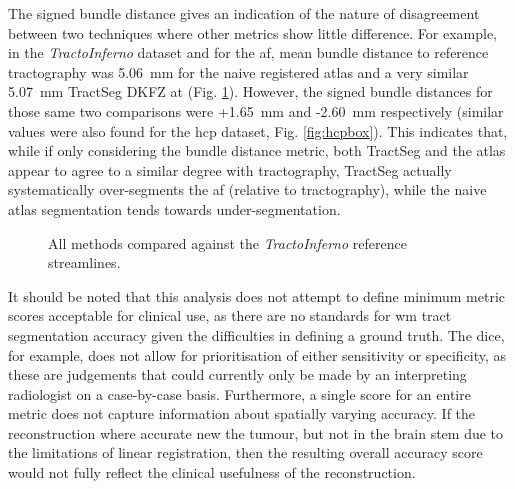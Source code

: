 The signed bundle distance gives an indication of the nature of disagreement between two techniques where other metrics show little difference.
For example, in the \textit{TractoInferno} dataset and for the \gls{af}, mean bundle distance to reference tractography was 5.06~mm for the naive registered atlas and a very similar 5.07~mm TractSeg DKFZ at (Fig. \ref{fig:combobox}). %
However, the signed bundle distances for those same two comparisons were +1.65~mm and -2.60~mm respectively (similar values were also found for the \gls{hcp} dataset, Fig. \ref{fig:hcpbox}).
This indicates that, while if only considering the bundle distance metric, both TractSeg and the atlas appear to agree to a similar degree with tractography, TractSeg actually systematically over-segments the \gls{af} (relative to tractography), while the naive atlas segmentation tends towards under-segmentation.

\begin{figure}[h!]
  \centering
  \caption[Comparison results with \textit{TractoInferno} reference streamlines]{All methods compared against the \textit{TractoInferno} reference streamlines. }
  \label{fig:combobox}
\end{figure}

It should be noted that this analysis does not attempt to define minimum metric scores acceptable for clinical use, as there are no standards for \gls{wm} tract segmentation accuracy given the difficulties in defining a ground truth.
The \gls{dice}, for example, does not allow for prioritisation of either sensitivity or specificity, as these are judgements that could currently only be made by an interpreting radiologist on a case-by-case basis.
Furthermore, a single score for an entire metric does not capture information about spatially varying accuracy.
If the reconstruction where accurate new the tumour, but not in the brain stem due to the limitations of linear registration, then the resulting overall accuracy score would not fully reflect the clinical usefulness of the reconstruction.

